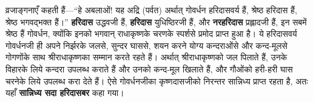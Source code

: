 \begin{sloppypar}\justifying{}
व्रजाङ्गनाएँ कहती हैं—“हे अबलाओं! यह अद्रि (पर्वत) अर्थात् गोवर्धन हरिदासवर्य हैं, श्रेष्ठ हरिदास हैं, श्रेष्ठ भगवद्भक्त हैं।” \textbf{हरिदास} उद्धवजी हैं, \textbf{हरिदास} युधिष्ठिरजी हैं, और \textbf{नरहरिदास} प्रह्लादजी हैं, इन सबमें श्रेष्ठ हैं गोवर्धन, क्योंकि इनको भगवान् राधाकृष्णके चरणके स्पर्शसे प्रमोद प्राप्त हुआ है। ये हरिदासवर्य गोवर्धनजी ही अपने निर्झरके जलसे, सुन्दर घाससे, शयन करने योग्य कन्दराओंसे और कन्द-मूलसे गोगणोंके साथ श्रीराधा\-कृष्णका सम्मान करते रहते हैं। अर्थात् श्रीराधा\-कृष्णको जल पिलाते हैं, उनके विहारके लिये कन्दरा उपलब्ध कराते हैं और उनको कन्द-मूल खिलाते हैं, और गौओंको हरी-हरी घास चरनेके लिये उपलब्ध करा देते हैं। ऐसे गोवर्धनजीका कृष्णदासजीको निरन्तर सान्निध्य प्राप्त रहता है, अतः यहाँ \textbf{सान्निध्य सदा हरिदासबर} कहा गया।
\end{sloppypar}


